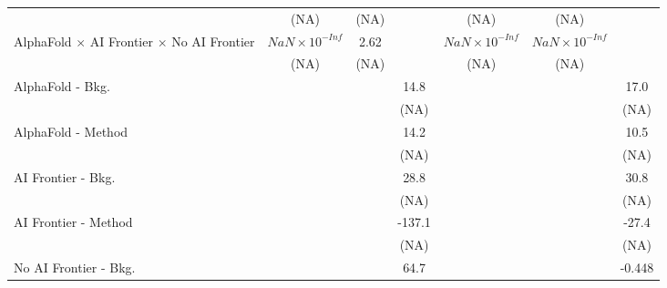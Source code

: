 \begin{tabular}{lcccccc}
                                                                              & (NA)                   & (NA)  &        & (NA)                   & (NA)                   &   \\   
   AlphaFold $\times$ AI Frontier $\times$ No AI Frontier                     & $NaN\times 10^{-Inf}$  & 2.62  &        & $NaN\times 10^{-Inf}$  & $NaN\times 10^{-Inf}$  &   \\   
                                                                              & (NA)                   & (NA)  &        & (NA)                   & (NA)                   &   \\   
   AlphaFold - Bkg.                                                           &                        &       & 14.8   &                        &                        & 17.0\\   
                                                                              &                        &       & (NA)   &                        &                        & (NA)\\   
   AlphaFold - Method                                                         &                        &       & 14.2   &                        &                        & 10.5\\   
                                                                              &                        &       & (NA)   &                        &                        & (NA)\\   
   AI Frontier - Bkg.                                                         &                        &       & 28.8   &                        &                        & 30.8\\   
                                                                              &                        &       & (NA)   &                        &                        & (NA)\\   
   AI Frontier - Method                                                       &                        &       & -137.1 &                        &                        & -27.4\\   
                                                                              &                        &       & (NA)   &                        &                        & (NA)\\   
   No AI Frontier - Bkg.                                                      &                        &       & 64.7   &                        &                        & -0.448\\   

\end{tabular}
